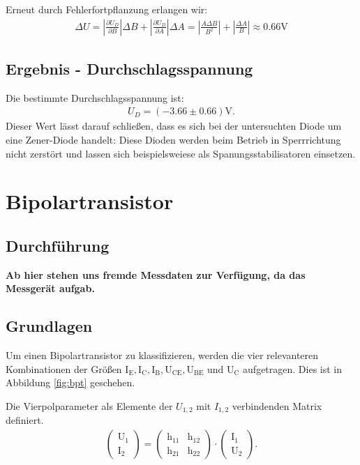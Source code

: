Erneut durch Fehlerfortpflanzung erlangen wir:
\begin{eqnarray}
    \Delta U =\left|\frac{\partial U_D}{\partial B}\right| \Delta B + \left|\frac{\partial U_D}{\partial A}\right|\Delta A = \left|\frac{A\Delta B}{B^2}\right|  + \left|\frac{\Delta A}{B}\right| \approx0.66 \mathrm{V}
\end{eqnarray}


\subsection*{Ergebnis - Durchschlagsspannung}
Die bestimmte Durchschlagsspannung ist:
\begin{eqnarray}
    U_D = (-3.66\pm 0.66)\mathrm{V}.
\end{eqnarray}
Dieser Wert lässt darauf schließen, dass es sich bei der untersuchten Diode um eine Zener-Diode handelt: Diese Dioden werden beim Betrieb in Sperrrichtung nicht zerstört und lassen sich beispielsweiese als Spanungsstabilisatoren einsetzen.

\section{Bipolartransistor}
\subsection*{Durchführung}

\textbf{Ab hier stehen uns fremde Messdaten zur Verfügung, da das Messgerät aufgab.}

\subsection{Grundlagen}
Um einen Bipolartransistor zu klassifizieren, werden die vier relevanteren Kombinationen der Größen $\text{I}_\text{E} , \text{I}_\text{C} , \text{I}_\text{B} , \text{U}_{\text{CE}} , \text{U}_{\text{BE}} \text{ und }\text{U}_\text{C} $ aufgetragen. Dies ist in Abbildung \ref{fig:bpt} geschehen.

Die Vierpolparameter als Ele\-mente der $U_{1,2}$ mit $I_{1,2}$ verbindenden Matrix definiert.
\begin{eqnarray}
    \begin{pmatrix}
        \text{U}_1\\
        \text{I}_2
    \end{pmatrix}=
    \begin{pmatrix}
        \text{h}_{11}&\text{h}_{12}\\
        \text{h}_{21}&\text{h}_{22}
    \end{pmatrix}\cdot
    \begin{pmatrix}
        \text{I}_1\\
        \text{U}_2
    \end{pmatrix}.
\end{eqnarray}

